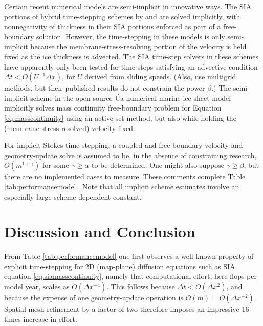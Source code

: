 \documentclass[review,letterpaper]{igs}
\begin{document}
Certain recent numerical models are semi-implicit in innovative ways.  The SIA portions of hybrid time-stepping schemes by \cite{JouvetGraeser2013} and \cite{BrinkerhoffJohnson2015} are solved implicitly, with nonnegativity of thickness in their SIA portions enforced as part of a free-boundary solution.  However, the time-stepping in these models is only semi-implicit because the membrane-stress-resolving portion of the velocity is held fixed as the ice thickness is advected.  The SIA time-step solvers in these schemes have apparently only been tested for time steps satisfying an advective condition $\Delta t < O(U^{-1}\Delta x)$, for $U$ derived from sliding speeds.  (Also, \cite{JouvetGraeser2013} use multigrid methods, but their published results do not constrain the power $\beta$.)
The semi-implicit scheme in the open-source \'Ua numerical marine ice sheet model \citep{Gudmundsson2013,Gudmundsson2021manual} implicitly solves mass continuity free-boundary problem for Equation \eqref{eq:masscontinuity} using an active set method, but also while holding the (membrane-stress-resolved) velocity fixed.

For implicit Stokes time-stepping, a coupled and free-boundary velocity and geometry-update solve is assumed to be, in the absence of constraining research, $O(m^{1+\gamma})$ for some $\gamma \ge \alpha$ to be determined.  One might also suppose $\gamma\ge \beta$, but there are no implemented cases to measure.  These comments complete Table \ref{tab:performancemodel}.  Note that all implicit scheme estimates involve an especially-large scheme-dependent constant.


\section{Discussion and Conclusion}

From Table \ref{tab:performancemodel} one first observes a well-known property of explicit time-stepping for 2D (map-plane) diffusion equations such as SIA equation \eqref{eq:siamasscontinuity}, namely that computational effort, here flops per model year, scales as $O(\Delta x^{-4})$.  This follows because $\Delta t < O(\Delta x^2)$, and because the expense of one geometry-update operation is $O(m) = O(\Delta x^{-2})$.  Spatial mesh refinement by a factor of two therefore imposes an impressive 16-times increase in effort.
\end{document}
